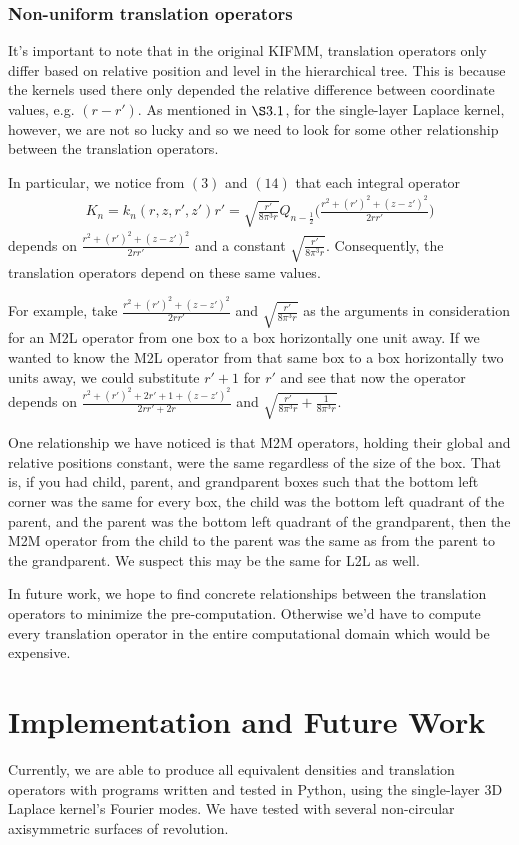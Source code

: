 \documentclass[12pt,letterpaper]{article}
\begin{document}
\subsubsection{Non-uniform translation operators}
It's important to note that in the original KIFMM, translation operators only differ based on relative position and level in the hierarchical tree. This is because the kernels used there only depended the relative difference between coordinate values, e.g. $(r-r')$. As mentioned in $\S3.1$, for the single-layer Laplace kernel, however, we are not so lucky and so we need to look for some other relationship between the translation operators.

In particular, we notice from $(3)$ and $(14)$ that each integral operator 
\begin{align}
K_n = k_n(r,z,r',z')r'=\sqrt{\frac{r'}{8\pi^3r}}Q_{n-\frac{1}{2}}\bigg(\frac{r^2+(r')^2+(z-z')^2}{2rr'}\bigg)
\end{align}
depends on $\frac{r^2+(r')^2+(z-z')^2}{2rr'}$ and a constant $\sqrt{\frac{r'}{8\pi^3r}}$. Consequently, the translation operators depend on these same values.

For example, take $\frac{r^2+(r')^2+(z-z')^2}{2rr'}$ and $\sqrt{\frac{r'}{8\pi^3r}}$ as the arguments in consideration for an M2L operator from one box to a box horizontally one unit away. If we wanted to know the M2L operator from that same box to a box horizontally two units away, we could substitute $r'+1$ for $r'$ and see that now the operator depends on $\frac{r^2+(r')^2+2r'+1+(z-z')^2}{2rr'+2r}$ and $\sqrt{\frac{r'}{8\pi^3r}+\frac{1}{8\pi^3r}}$. 

One relationship we have noticed is that M2M operators, holding their global and relative positions constant, were the same regardless of the size of the box. That is, if you had child, parent, and grandparent boxes such that the bottom left corner was the same for every box, the child was the bottom left quadrant of the parent, and the parent was the bottom left quadrant of the grandparent, then the M2M operator from the child to the parent was the same as from the parent to the grandparent. We suspect this may be the same for L2L as well.

In future work, we hope to find concrete relationships between the translation operators to minimize the pre-computation. Otherwise we'd have to compute every translation operator in the entire computational domain which would be expensive.

\section{Implementation and Future Work}
Currently, we are able to produce all equivalent densities and translation operators with programs written and tested in Python, using the single-layer 3D Laplace kernel's Fourier modes. We have tested with several non-circular axisymmetric surfaces of revolution.
\end{document}

